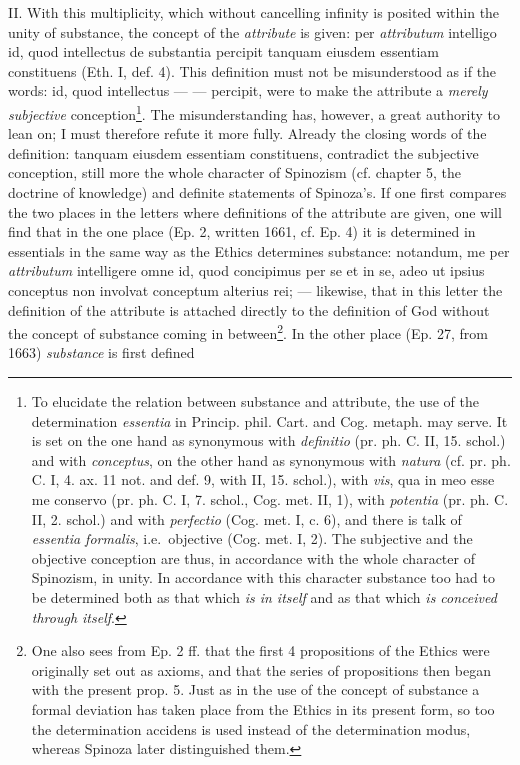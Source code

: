 \documentclass[12pt,a4paper,openany]{book}
\newcommand{\opage}[1]{\marginnote{\footnotesize\textit{[#1]}}}
\begin{document}
II. With this multiplicity, which without cancelling infinity is posited
within the unity of substance, the concept of the \emph{attribute} is given: per
\emph{attributum} intelligo id, quod intellectus de substantia
percipit tanquam eiusdem essentiam constituens (Eth. I, def. 4). This
definition must not be misunderstood as if the words: id, quod intellectus
--- --- percipit, were to make the attribute a \emph{merely subjective}
conception\footnote{To elucidate the relation between substance and
attribute, the use of the determination \emph{essentia} in Princip. phil.
Cart. and Cog. metaph. may serve. It is set on the one hand as synonymous
with \emph{definitio} (pr. ph. C. II, 15. schol.) and with
\emph{conceptus}, on the other hand as synonymous with \emph{natura}
(cf. pr. ph. C. I, 4. ax. 11 not. and def. 9, with II, 15. schol.), with
\emph{vis}, qua in meo esse me conservo (pr. ph. C. I, 7. schol., Cog.
met. II, 1), with \emph{potentia} (pr. ph. C. II, 2. schol.) and with
\emph{perfectio} (Cog. met. I, c. 6), and there is talk of \emph{essentia
formalis}, i.e.\ objective (Cog. met. I, 2). The subjective and the objective
conception are thus, in accordance with the whole character of Spinozism, in unity.
In accordance with this character substance too had to be determined both as
that which \emph{is in itself} and as that which \emph{is conceived through itself}.}. The misunderstanding
has, however, a great authority to lean on; I must therefore
refute it more fully. Already the closing words of the definition: tanquam
eiusdem essentiam constituens, contradict the subjective conception,
still more the whole character of Spinozism (cf. chapter 5, the doctrine of
knowledge) and definite statements of Spinoza's. If one first compares the
two places in the letters where definitions of the attribute are given,
one will find that in the one place (Ep. 2, written 1661, cf. Ep. 4)
it is determined in essentials in the same way as the Ethics determines
substance: notandum, me per \emph{attributum} intelligere omne id, quod
concipimus per se et in se, adeo ut ipsius conceptus non involvat
conceptum alterius rei; --- likewise, that in this letter the definition of
the attribute is attached directly to the definition of God without the
\opage{48}\setcounter{footnote}{0}concept of substance coming in between\footnote{One also sees from Ep. 2 ff. that the first 4
propositions of the Ethics were originally set out as axioms, and that
the series of propositions then began with the present prop. 5. Just as in
the use of the concept of substance a formal deviation has taken place from
the Ethics in its present form, so too the determination accidens is
used instead of the determination modus, whereas Spinoza later distinguished
them.}. In the other place (Ep. 27, from 1663) \emph{substance} is first defined
\end{document}
